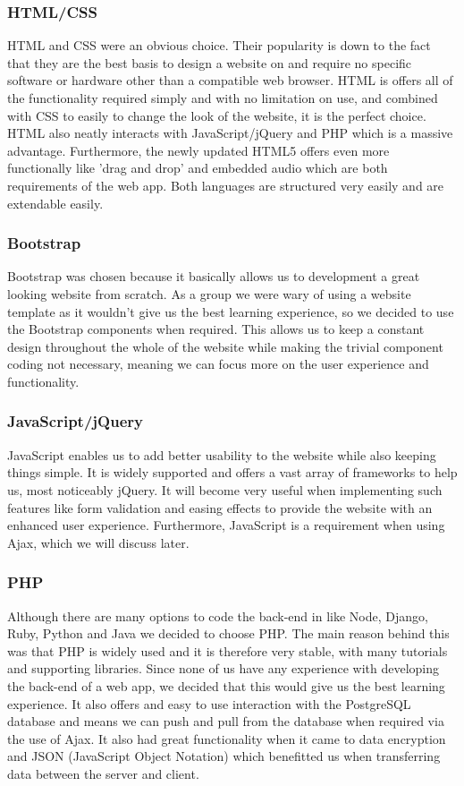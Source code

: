 \documentclass{article}
\begin{document}
\subsubsection{HTML/CSS}
HTML and CSS were an obvious choice. Their popularity is down to the fact that they are the best basis to design a website on and require no specific software or hardware other than a compatible web browser. HTML is offers all of the functionality required simply and with no limitation on use, and combined with CSS to easily to change the look of the website, it is the perfect choice. HTML also neatly interacts with JavaScript/jQuery and PHP which is a massive advantage. Furthermore, the newly updated HTML5 offers even more functionally like 'drag and drop' and embedded audio which are both requirements of the web app. Both languages are structured very easily and are extendable easily.
\subsubsection{Bootstrap}
Bootstrap was chosen because it basically allows us to development a great looking website from scratch. As a group we were wary of using a website template as it wouldn't give us the best learning experience, so we decided to use the Bootstrap components when required. This allows us to keep a constant design throughout the whole of the website while making the trivial component coding not necessary, meaning we can focus more on the user experience and functionality.
\subsubsection{JavaScript/jQuery}
JavaScript enables us to add better usability to the website while also keeping things simple. It is widely supported and offers a vast array of frameworks to help us, most noticeably jQuery. It will become very useful when implementing such features like form validation and easing effects to provide the website with an enhanced user experience. Furthermore, JavaScript is a requirement when using Ajax, which we will discuss later.
\subsubsection{PHP}
Although there are many options to code the back-end in like Node, Django, Ruby, Python and Java we decided to choose PHP. The main reason behind this was that PHP is widely used and it is therefore very stable, with many tutorials and supporting libraries. Since none of us have any experience with developing the back-end of a web app, we decided that this would give us the best learning experience. It also offers and easy to use interaction with the PostgreSQL database and means we can push and pull from the database when required via the use of Ajax. It also had great functionality when it came to data encryption and JSON (JavaScript Object Notation) which benefitted us when transferring data between the server and client.
\end{document}
